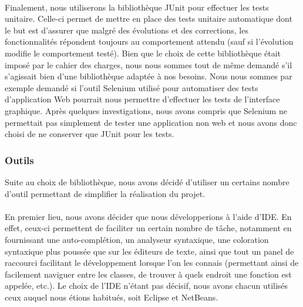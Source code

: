 \documentclass[a4paper,11pt]{article}
\begin{document}
\paragraph{} Finalement, nous utiliserons la bibliothèque JUnit pour effectuer les tests unitaire. Celle-ci permet de mettre en place des tests unitaire automatique dont le but est d'assurer que malgré des évolutions et des corrections, les fonctionnalités répondent toujours au comportement attendu (sauf si l'évolution modifie le comportement testé). Bien que le choix de cette bibliothèque était imposé par le cahier des charges, nous nous sommes tout de même demandé s'il s'agissait bien d'une bibliothèque adaptée à nos besoins. Nous nous sommes par exemple demandé si l'outil Selenium utilisé pour automatiser des tests d'application Web pourrait nous permettre d’effectuer les tests de l'interface graphique. Après quelques investigations, nous avons compris que Selenium ne permettait pas simplement de tester une application non web et nous avons donc choisi de ne conserver que JUnit pour les tests.

\subsubsection{Outils}
Suite au choix de bibliothèque, nous avons décidé d'utiliser un certains nombre d'outil permettant de simplifier la réalisation du projet.

\paragraph{} En premier lieu, nous avons décider que nous développerions à l'aide d'IDE. En effet, ceux-ci permettent de faciliter un certain nombre de tâche, notamment en fournissant une auto-complétion, un analyseur syntaxique, une coloration syntaxique plus poussée que sur les éditeurs de texte, ainsi que tout un panel de raccourci facilitant le développement lorsque l'on les connais (permettant ainsi de facilement naviguer entre les classes, de trouver à quels endroit une fonction est appelée, etc.). Le choix de l'IDE n'étant pas décisif, nous avons chacun utilisés ceux auquel nous étions habitués, soit Eclipse et NetBeans.
\end{document}
